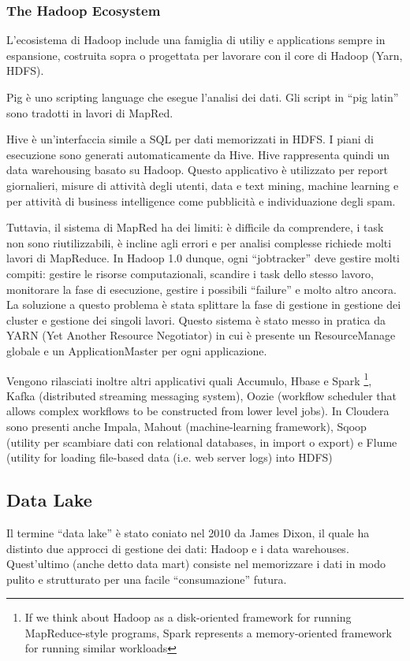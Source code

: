 \documentclass[a4page, 11pt]{article}
\begin{document}
\subsubsection{The Hadoop Ecosystem}
L'ecosistema di Hadoop include una famiglia di utiliy e applications sempre in espansione, costruita sopra o progettata per lavorare con il core di Hadoop (Yarn, HDFS).

Pig è uno scripting language che esegue l’analisi dei dati. Gli script in “pig latin” sono tradotti in lavori di MapRed. 

Hive è un’interfaccia simile a SQL per dati memorizzati in HDFS. I piani di esecuzione sono generati automaticamente da Hive. Hive rappresenta quindi un data warehousing basato su Hadoop. Questo applicativo è utilizzato per report giornalieri, misure di attività degli utenti, data e text mining, machine learning e per attività di business intelligence come pubblicità e individuazione degli spam.

Tuttavia, il sistema di MapRed ha dei limiti: è difficile da comprendere, i task non sono riutilizzabili, è incline agli errori e per analisi complesse richiede molti lavori di MapReduce. In Hadoop 1.0 dunque, ogni “jobtracker” deve gestire molti compiti: gestire le risorse computazionali, scandire i task dello stesso lavoro, monitorare la fase di esecuzione, gestire i possibili “failure” e molto altro ancora. La soluzione a questo problema è stata splittare la fase di gestione in gestione dei cluster e gestione dei singoli lavori. Questo sistema è stato messo in pratica da YARN (Yet Another Resource Negotiator) in cui è presente un ResourceManage globale e un ApplicationMaster per ogni applicazione.

Vengono rilasciati inoltre altri applicativi quali Accumulo, Hbase e Spark \footnote{If we think about Hadoop as a disk-oriented framework for running MapReduce-style programs, Spark represents a memory-oriented framework for running similar workloads}, Kafka (distributed streaming messaging system), Oozie (workflow scheduler that allows complex workflows to be constructed from lower level jobs).
In Cloudera sono presenti anche Impala, Mahout (machine-learning framework), Sqoop (utility per scambiare dati con relational databases, in import o export) e Flume (utility for loading file-based data (i.e. web server logs) into HDFS) 

\subsection{Data Lake}
Il termine “data lake” è stato coniato nel 2010 da James Dixon, il quale ha distinto due approcci di gestione dei dati: Hadoop e i data warehouses. Quest’ultimo (anche detto data mart) consiste nel memorizzare i dati in modo pulito e strutturato per una facile “consumazione” futura.
\end{document}
